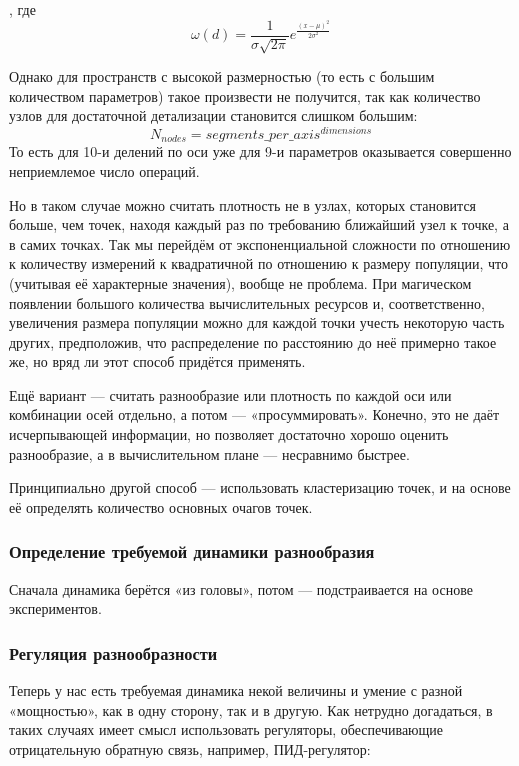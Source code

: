 , где
\begin{equation}
    \omega(d) = \frac{1}{\sigma \sqrt{2 \pi}}e^{\frac{(x - \mu)^2} {2 \sigma^2}}
\end{equation}

Однако для пространств с высокой размерностью (то есть с большим количеством параметров) такое произвести не получится, так как количество узлов
для достаточной детализации становится слишком большим:
\begin{equation}
    N_{nodes} = segments\_per\_axis^{dimensions}
\end{equation}
То есть для 10-и делений по оси уже для 9-и параметров оказывается совершенно неприемлемое число операций.

Но в таком случае можно считать плотность не в узлах, которых становится больше, чем точек,
находя каждый раз по требованию ближайший узел к точке, а в самих точках.
Так мы перейдём от экспоненциальной сложности по отношению к количеству измерений
к квадратичной по отношению к размеру популяции, что (учитывая её характерные значения), вообще не проблема.
При магическом появлении большого количества вычислительных ресурсов и, соответственно, увеличения размера популяции
можно для каждой точки учесть некоторую часть других, предположив, что распределение по расстоянию до неё примерно такое же,
но вряд ли этот способ придётся применять.

Ещё вариант — считать разнообразие или плотность по каждой оси или комбинации осей отдельно, а потом — «просуммировать».
Конечно, это не даёт исчерпывающей информации, но позволяет достаточно хорошо оценить разнообразие, а в вычислительном плане
— несравнимо быстрее.

Принципиально другой способ — использовать кластеризацию точек, и на основе её определять количество основных очагов точек.

\subsubsection{Определение требуемой динамики разнообразия}
Сначала динамика берётся «из головы», потом — подстраивается на основе экспериментов.

\subsubsection{Регуляция разнообразности}
Теперь у нас есть требуемая динамика некой величины и умение с разной «мощностью», как в одну сторону, так и в другую.
Как нетрудно догадаться, в таких случаях имеет смысл использовать регуляторы, обеспечивающие отрицательную обратную связь,
например, ПИД-регулятор:

